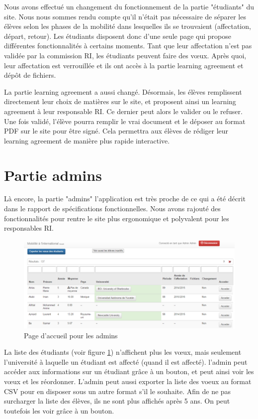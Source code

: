 Nous avons effectué un changement du fonctionnement de la partie "étudiants" du site. Nous nous sommes rendu compte qu'il n'était pas nécessaire de séparer les élèves selon les phases de la mobilité dans lesquelles ils se trouvaient (affectation, départ, retour). Les étudiants disposent donc d'une seule page qui propose différentes fonctionnalités à certains moments. Tant que leur affectation n'est pas validée par la commission RI, les étudiants peuvent faire des vœux. Après quoi, leur affectation est verrouillée et ils ont accès à la partie learning agreement et dépôt de fichiers.
\smallbreak

La partie learning agreement a aussi changé. Désormais, les élèves remplissent directement leur choix de matières sur le site, et proposent ainsi un learning agreement à leur responsable RI. Ce dernier peut alors le valider ou le refuser.
Une fois validé, l'élève pourra remplir le vrai document et le déposer au format PDF sur le site pour être signé. Cela permettra aux élèves de rédiger leur learning agreement de manière plus rapide interactive.

\section{Partie admins}
Là encore, la partie "admins" l'application est très proche de ce qui a été décrit dans le rapport de spécifications fonctionnelles. Nous avons rajouté des fonctionnalités pour rentre le site plus ergonomique et polyvalent pour les responsables RI.

\begin{figure}
	\centering
	\includegraphics[scale=0.5]{images/accueil_admin.PNG}
	\caption{Page d'accueil pour les admins}
	\label{accueil_admins}
\end{figure}

La liste des étudiants (voir figure \ref{accueil_admins}) n'affichent plus les vœux, mais seulement l'université à laquelle un étudiant est affecté (quand il est affecté). l'admin peut accéder aux informations sur un étudiant grâce à un bouton, et peut ainsi voir les vœux et les réordonner. L'admin peut aussi exporter la liste des voeux au format CSV pour en disposer sous un autre format s'il le souhaite. Afin de ne pas surcharger la liste des élèves, ils ne sont plus affichés après 5 ans. On peut toutefois les voir grâce à un bouton.

